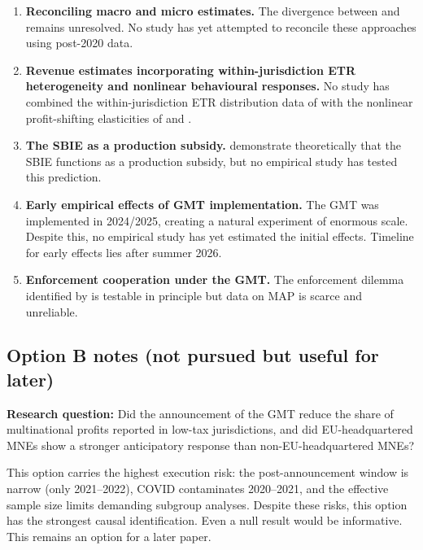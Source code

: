 \documentclass[11pt,a4paper]{article}
\begin{document}
\begin{enumerate}
\item \textbf{Reconciling macro and micro estimates.} The divergence between \citet{torslov2023} and \citet{blouin2023} remains unresolved. No study has yet attempted to reconcile these approaches using post-2020 data.

\item \textbf{Revenue estimates incorporating within-jurisdiction ETR heterogeneity and nonlinear behavioural responses.} No study has combined the within-jurisdiction ETR distribution data of \citet{hugger2026} with the nonlinear profit-shifting elasticities of \citet{dowd2017} and \citet{garcia-bernardo2024}.

\item \textbf{The SBIE as a production subsidy.} \citet{schjelderup2024} demonstrate theoretically that the SBIE functions as a production subsidy, but no empirical study has tested this prediction.

\item \textbf{Early empirical effects of GMT implementation.} The GMT was implemented in 2024/2025, creating a natural experiment of enormous scale. Despite this, no empirical study has yet estimated the initial effects. Timeline for early effects lies after summer 2026.

\item \textbf{Enforcement cooperation under the GMT.} The enforcement dilemma identified by \citet{jean2026} is testable in principle but data on MAP is scarce and unreliable.
\end{enumerate}

\subsection{Option B notes (not pursued but useful for later)}

\textbf{Research question:} Did the announcement of the GMT reduce the share of multinational profits reported in low-tax jurisdictions, and did EU-headquartered MNEs show a stronger anticipatory response than non-EU-headquartered MNEs?

This option carries the highest execution risk: the post-announcement window is narrow (only 2021--2022), COVID contaminates 2020--2021, and the effective sample size limits demanding subgroup analyses. Despite these risks, this option has the strongest causal identification. Even a null result would be informative. This remains an option for a later paper.
\end{document}
